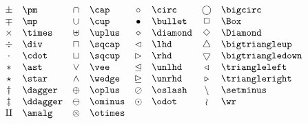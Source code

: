 \documentclass{article}
\begin{document}
    \begin{math}
        \begin{array}{clclclcl}
            \pm & \verb=\pm= & \cap & \verb=\cap= & \circ & \verb=\circ= & \bigcirc & \verb=\bigcirc= \\
            \mp & \verb=\mp= & \cup & \verb=\cup= & \bullet & \verb=\bullet= & \Box & \verb=\Box= \\
            \times & \verb=\times= & \uplus & \verb=\uplus= & \diamond & \verb=\diamond= & \Diamond & \verb=\Diamond= \\
            \div & \verb=\div= & \sqcap & \verb=\sqcap= & \lhd & \verb=\lhd=  & \bigtriangleup & \verb=\bigtriangleup= \\
            \cdot & \verb=\cdot= & \sqcup & \verb=\sqcup= & \rhd & \verb=\rhd=  & \bigtriangledown & \verb=\bigtriangledown= \\
            \ast & \verb=\ast= & \vee & \verb=\vee= & \unlhd & \verb=\unlhd=  & \triangleleft & \verb=\triangleleft= \\
            \star & \verb=\star= & \wedge & \verb=\wedge= & \unrhd & \verb=\unrhd=  & \triangleright & \verb=\triangleright= \\
            \dagger & \verb=\dagger= & \oplus & \verb=\oplus= & \oslash & \verb=\oslash=  & \setminus & \verb=\setminus= \\
            \ddagger & \verb=\ddagger= & \ominus & \verb=\ominus= & \odot & \verb=\odot=  & \wr & \verb=\wr= \\
            \amalg & \verb=\amalg= & \otimes & \verb=\otimes= \\
        \end{array}
    \end{math}
\end{document}
